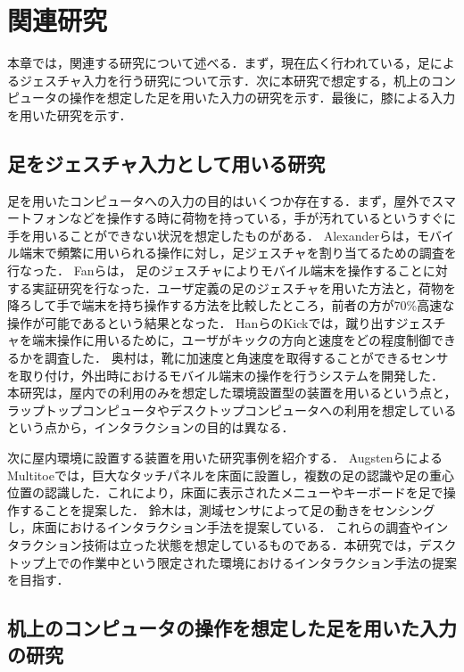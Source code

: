 \chapter{関連研究}
本章では，関連する研究について述べる．まず，現在広く行われている，足によるジェスチャ入力を行う研究について示す．次に本研究で想定する，机上のコンピュータの操作を想定した足を用いた入力の研究を示す．最後に，膝による入力を用いた研究を示す．
\section{足をジェスチャ入力として用いる研究}
足を用いたコンピュータへの入力の目的はいくつか存在する．まず，屋外でスマートフォンなどを操作する時に荷物を持っている，手が汚れているというすぐに手を用いることができない状況を想定したものがある．
Alexanderら\cite{Alexander:2012:PYB:2207676.2208575}は，モバイル端末で頻繁に用いられる操作に対し，足ジェスチャを割り当てるための調査を行なった．	
Fanら\cite{Fan:2017:ESF:3123021.3123043}は，
足のジェスチャによりモバイル端末を操作することに対する実証研究を行なった．ユーザ定義の足のジェスチャを用いた方法と，荷物を降ろして手で端末を持ち操作する方法を比較したところ，前者の方が70\%高速な操作が可能であるという結果となった．
HanらのKick\cite{Han:2011:KIU:2037373.2037379}では，蹴り出すジェスチャを端末操作に用いるために，ユーザがキックの方向と速度をどの程度制御できるかを調査した．
奥村\cite{okumura_2011}は，靴に加速度と角速度を取得することができるセンサを取り付け，外出時におけるモバイル端末の操作を行うシステムを開発した．
本研究は，屋内での利用のみを想定した環境設置型の装置を用いるという点と，ラップトップコンピュータやデスクトップコンピュータへの利用を想定しているという点から，インタラクションの目的は異なる．

次に屋内環境に設置する装置を用いた研究事例を紹介する．
AugstenらによるMultitoe\cite{Augsten:2010:MHI:1866029.1866064}では，巨大なタッチパネルを床面に設置し，複数の足の認識や足の重心位置の認識した．これにより，床面に表示されたメニューやキーボードを足で操作することを提案した．
鈴木\cite{ssuzuki_2009}は，測域センサによって足の動きをセンシングし，床面におけるインタラクション手法を提案している．
これらの調査やインタラクション技術は立った状態を想定しているものである．本研究では，デスクトップ上での作業中という限定された環境におけるインタラクション手法の提案を目指す．

\section{机上のコンピュータの操作を想定した足を用いた入力の研究}

